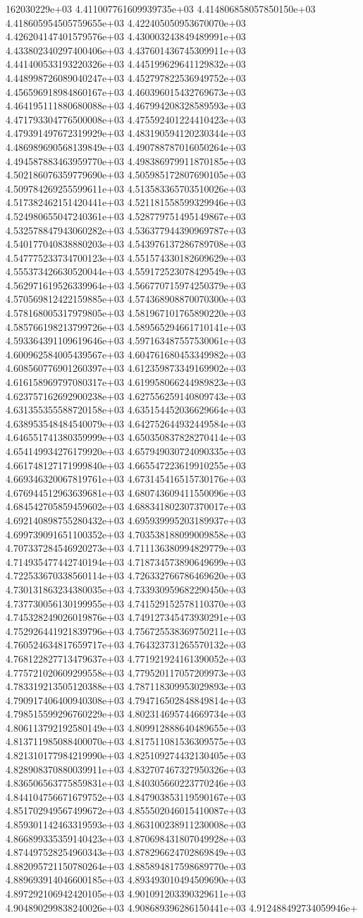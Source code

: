 162030229e+03	4.411007761609939735e+03	4.414806858057850150e+03	4.418605954505759655e+03	4.422405050953670070e+03	4.426204147401579576e+03	4.430003243849489991e+03	4.433802340297400406e+03	4.437601436745309911e+03	4.441400533193220326e+03	4.445199629641129832e+03	4.448998726089040247e+03	4.452797822536949752e+03	4.456596918984860167e+03	4.460396015432769673e+03	4.464195111880680088e+03	4.467994208328589593e+03	4.471793304776500008e+03	4.475592401224410423e+03	4.479391497672319929e+03	4.483190594120230344e+03	4.486989690568139849e+03	4.490788787016050264e+03	4.494587883463959770e+03	4.498386979911870185e+03	4.502186076359779690e+03	4.505985172807690105e+03	4.509784269255599611e+03	4.513583365703510026e+03	4.517382462151420441e+03	4.521181558599329946e+03	4.524980655047240361e+03	4.528779751495149867e+03	4.532578847943060282e+03	4.536377944390969787e+03	4.540177040838880203e+03	4.543976137286789708e+03	4.547775233734700123e+03	4.551574330182609629e+03	4.555373426630520044e+03	4.559172523078429549e+03	4.562971619526339964e+03	4.566770715974250379e+03	4.570569812422159885e+03	4.574368908870070300e+03	4.578168005317979805e+03	4.581967101765890220e+03	4.585766198213799726e+03	4.589565294661710141e+03	4.593364391109619646e+03	4.597163487557530061e+03	4.600962584005439567e+03	4.604761680453349982e+03	4.608560776901260397e+03	4.612359873349169902e+03	4.616158969797080317e+03	4.619958066244989823e+03	4.623757162692900238e+03	4.627556259140809743e+03	4.631355355588720158e+03	4.635154452036629664e+03	4.638953548484540079e+03	4.642752644932449584e+03	4.646551741380359999e+03	4.650350837828270414e+03	4.654149934276179920e+03	4.657949030724090335e+03	4.661748127171999840e+03	4.665547223619910255e+03	4.669346320067819761e+03	4.673145416515730176e+03	4.676944512963639681e+03	4.680743609411550096e+03	4.684542705859459602e+03	4.688341802307370017e+03	4.692140898755280432e+03	4.695939995203189937e+03	4.699739091651100352e+03	4.703538188099009858e+03	4.707337284546920273e+03	4.711136380994829779e+03	4.714935477442740194e+03	4.718734573890649699e+03	4.722533670338560114e+03	4.726332766786469620e+03	4.730131863234380035e+03	4.733930959682290450e+03	4.737730056130199955e+03	4.741529152578110370e+03	4.745328249026019876e+03	4.749127345473930291e+03	4.752926441921839796e+03	4.756725538369750211e+03	4.760524634817659717e+03	4.764323731265570132e+03	4.768122827713479637e+03	4.771921924161390052e+03	4.775721020609299558e+03	4.779520117057209973e+03	4.783319213505120388e+03	4.787118309953029893e+03	4.790917406400940308e+03	4.794716502848849814e+03	4.798515599296760229e+03	4.802314695744669734e+03	4.806113792192580149e+03	4.809912888640489655e+03	4.813711985088400070e+03	4.817511081536309575e+03	4.821310177984219990e+03	4.825109274432130405e+03	4.828908370880039911e+03	4.832707467327950326e+03	4.836506563775859831e+03	4.840305660223770246e+03	4.844104756671679752e+03	4.847903853119590167e+03	4.851702949567499672e+03	4.855502046015410087e+03	4.859301142463319593e+03	4.863100238911230008e+03	4.866899335359140423e+03	4.870698431807049928e+03	4.874497528254960343e+03	4.878296624702869849e+03	4.882095721150780264e+03	4.885894817598689770e+03	4.889693914046600185e+03	4.893493010494509690e+03	4.897292106942420105e+03	4.901091203390329611e+03	4.904890299838240026e+03	4.908689396286150441e+03	4.912488492734059946e+